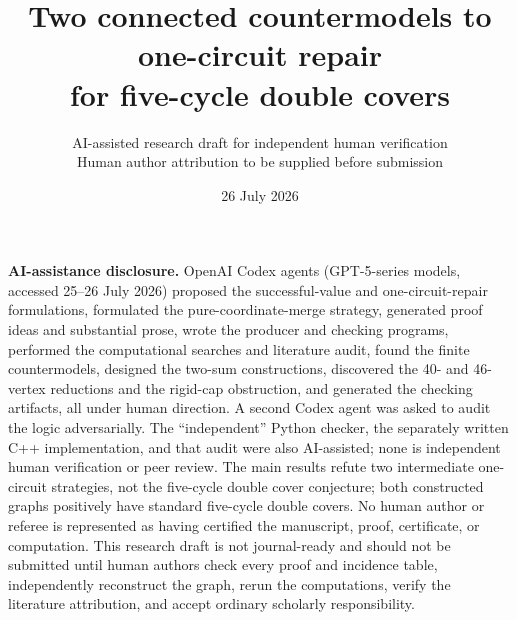 \documentclass[11pt]{article}
\title{Two connected countermodels to one-circuit repair\\
for five-cycle double covers}
\author{AI-assisted research draft for independent human verification\\
\small Human author attribution to be supplied before submission}
\date{26 July 2026}
\theoremstyle{definition}
\theoremstyle{remark}
\begin{document}
\maketitle

\noindent
\colorbox{yellow!22}{%
  \parbox{\dimexpr\linewidth-2\fboxsep\relax}{%
  \textbf{AI-assistance disclosure.}
  OpenAI Codex agents (GPT-5-series models, accessed 25--26 July 2026)
  proposed the successful-value and one-circuit-repair formulations,
  formulated the pure-coordinate-merge strategy,
  generated proof ideas and substantial prose, wrote the producer and
  checking programs, performed the computational searches and literature
  audit, found the finite countermodels, designed the two-sum
  constructions, discovered the 40- and 46-vertex reductions and the
  rigid-cap obstruction, and generated the checking artifacts, all under
  human direction.  A second Codex agent
  was asked to audit the logic
  adversarially.  The ``independent'' Python checker, the separately
  written C++ implementation, and that audit were also AI-assisted; none
  is independent human verification or peer review.  The main results
  refute two intermediate one-circuit strategies, not the five-cycle
  double cover conjecture; both constructed graphs positively have
  standard five-cycle double covers.  No human author or referee is represented as
  having certified the manuscript, proof, certificate, or computation.
  This research draft is not journal-ready and should not be submitted
  until human authors check every proof and incidence table, independently
  reconstruct the graph, rerun the computations, verify the literature
  attribution, and accept ordinary scholarly responsibility.}}
\end{document}
